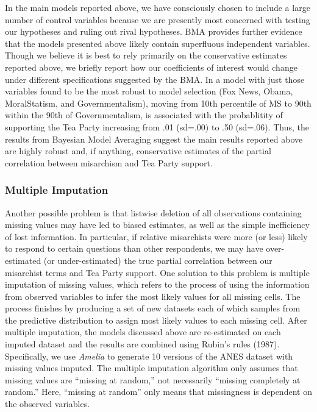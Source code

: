 \documentclass[12pt,]{article}
\begin{document}
In the main models reported above, we have consciously chosen to include
a large number of control variables because we are presently most
concerned with testing our hypotheses and ruling out rival hypotheses.
BMA provides further evidence that the models presented above likely
contain superfluous independent variables. Though we believe it is best
to rely primarily on the conservative estimates reported above, we
briefly report how our coefficients of interest would change under
different specifications suggested by the BMA. In a model with just
those variables found to be the most robust to model selection (Fox
News, Obama, MoralStatism, and Governmentalism), moving from 10th
percentile of MS to 90th within the 90th of Governmentalism, is
associated with the probablitity of supporting the Tea Party increasing
from .01 (sd=.00) to .50 (sd=.06). Thus, the results from Bayesian Model
Averaging suggest the main results reported above are highly robust and,
if anything, conservative estimates of the partial correlation between
misarchism and Tea Party support.

\subsubsection{Multiple Imputation}\label{multiple-imputation}

Another possible problem is that listwise deletion of all observations
containing missing values may have led to biased estimates, as well as
the simple inefficiency of lost information. In particular, if relative
misarchists were more (or less) likely to respond to certain questions
than other respondents, we may have over-estimated (or under-estimated)
the true partial correlation between our misarchist terms and Tea Party
support. One solution to this problem is multiple imputation of missing
values, which refers to the process of using the information from
observed variables to infer the most likely values for all missing
cells. The process finishes by producing a set of new datasets each of
which samples from the predictive distribution to assign most likely
values to each missing cell. After multiple imputation, the models
discussed above are re-estimated on each imputed dataset and the results
are combined using Rubin's rules (1987). Specifically, we use
\emph{Amelia} to generate 10 versions of the ANES dataset with missing
values imputed. The multiple imputation algorithm only assumes that
missing values are ``missing at random,'' not necessarily ``missing
completely at random.'' Here, ``missing at random'' only means that
missingness is dependent on the observed variables.
\end{document}
